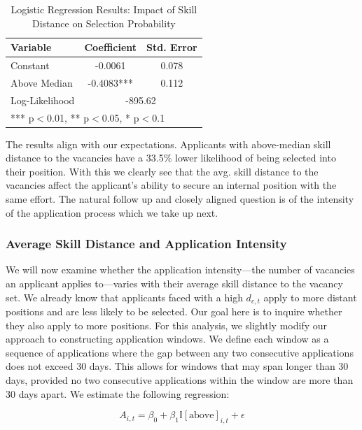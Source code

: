 \begin{table}[h]
\centering
\caption{Logistic Regression Results: Impact of Skill Distance on Selection Probability} 
\renewcommand{\arraystretch}{1.2} %
\begin{tabular}{lcc}
\hline
\textbf{Variable} & \textbf{Coefficient} & \textbf{Std. Error} \\
\hline
Constant & -0.0061 & 0.078 \\
Above Median & -0.4083*** & 0.112 \\
\hline
Log-Likelihood & \multicolumn{2}{c}{-895.62} \\
\hline
\multicolumn{3}{l}{\footnotesize{*** p$<$0.01, ** p$<$0.05, * p$<$0.1}} \\
\end{tabular}
\label{tab:selection_prob}
\end{table}

The results align with our expectations. Applicants with above-median skill distance to the vacancies have 
a 33.5\% lower likelihood of being selected into their position. With this we clearly see that the avg. skill distance 
to the vacancies affect the applicant's ability to secure an internal position with the same effort. The natural 
follow up and closely aligned question is of the intensity of the application process which we take up next.


\subsubsection{Average Skill Distance and Application Intensity}

We will now examine whether the application intensity—the number of vacancies an applicant applies to—varies with 
their average skill distance to the vacancy set. We already know that applicants faced with a high $d_{c,t}$ apply 
to more distant positions and are less likely to be selected. Our goal here is to inquire whether they also apply 
to more positions. For this analysis, we slightly modify our approach to constructing application windows. We define 
each window as a sequence of applications where the gap between any two consecutive applications does not exceed 
30 days. This allows for windows that may span longer than 30 days, provided no two consecutive applications 
within the window are more than 30 days apart. We estimate the following regression:

\begin{equation}
    A_{i,t} = \beta_0 + \beta_1 \mathbb{I}[\text{above}]_{i,t} + \epsilon
\end{equation}

